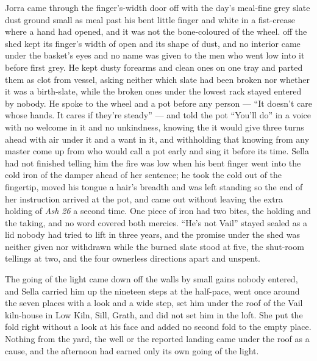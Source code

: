 Jorra came through the finger's-width door off  with the day's meal-fine grey slate dust ground small as meal past his bent little finger and white in a fist-crease where a hand had opened, and it was not the bone-coloured  of the wheel.  off the shed kept its finger's width of open and its shape of dust, and no interior came under the basket's eyes and no name was given to the men who went low into it before first grey. He kept dusty forearms and clean ones on one tray and parted them as clot from vessel, asking neither which slate had been broken nor whether it was a birth-slate, while the broken ones under the lowest rack stayed entered by nobody. He spoke to the wheel and a pot before any person --- “It doesn't care whose hands. It cares if they're steady” --- and told the pot “You'll do” in a voice with no welcome in it and no unkindness, knowing the  it would give three turns ahead with air under it and a want in it, and withholding that knowing from any master come up from  who would call a pot early and sing it before its time. Sella had not finished telling him the fire was low when his bent finger went into the cold iron of the damper ahead of her sentence; he took the cold out of the fingertip, moved his tongue a hair's breadth and was left standing so the end of her instruction arrived at the pot, and came out without leaving the extra holding of \emph{Ash 26} a second time. One piece of iron had two bites, the holding and the taking, and no  word covered both mercies. “He's not Vail” stayed sealed as a lid nobody had tried to lift in three years, and the promise under the shed was neither given nor withdrawn while the burned slate stood at five, the shut-room tellings at two, and the four ownerless directions apart and unspent.

The going of the light came down off the walls by small gains nobody entered, and Sella carried him up the nineteen steps at the half-pace, went once around the seven places with a look and a wide step, set him under the roof of the Vail kiln-house in Low Kiln, Sill, Grath, and did not set him in the loft. She put the fold right without a look at his face and added no second fold to the empty place. Nothing from the yard, the well or the reported landing came under the roof as a cause, and the afternoon had earned only its own going of the light.

